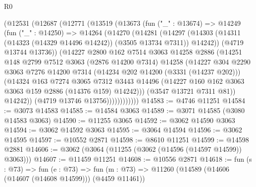 \begin{lexlean}{R0}
\begin{coremodule}
            (@12531
              (@12687
                (@12771
                  (@13519
                    (@13673
                      (fun ("_" : @13674) =>
                      @14249
                        (fun ("_" : @14250) =>
                        @14264
                          (@14270
                            (@14281
                              (@14297
                                (@14303
                                  (@14311 (@14323 (@14329 @14496 @14242)) (@3505 @13734 @7311))
                                  @14242))
                              (@4719 @13744 @13736))
                            (@14227
                              @2800
                              @162
                              @7514
                              @3063
                              @14258
                              @2886
                              (@14251
                                @148
                                @2799
                                @7512
                                @3063
                                (@2876 @14200 @7314)
                                @14258
                                (@14227
                                  @304
                                  @2290
                                  @3063
                                  @7276
                                  @14200
                                  @7314
                                  (@14234 @202 @14200 (@3331 (@14237 @202)))
                                  (@14324
                                    @163
                                    @7274
                                    @3065
                                    @7312
                                    @3443
                                    @14496
                                    (@14227 @160 @162 @3063 @3063 @159 @2886 (@14376 @159) @14242)))
                                (@3547 @13721 @7311 @81))
                              @14242))
                          (@4719 @13746 @13756))))))))))))
@14583 := @4746 @11251
@14584 := @3073 @14583
@14585 := @14584 @3063
@14589 := @3071 @14585 (@3080 @14583 @3063)
@14590 := @11255 @3065
@14592 := @3062 @14590 @3063
@14594 := @3062 @14592 @3063
@14595 := @3064 @14594
@14596 := @3062 @14595
@14597 := @10552 @2871
@14598 := @8610 @11251
@14599 := @14598 @2881
@14606 := @3062 (@3064 (@11255 (@3062 (@14596 (@14597 @14599)) @3063)))
@14607 := @11459 @11251
@14608 := @10556 @2871
@14618 := fun (s : @73) =>
  fun (e : @73) => fun (m : @73) => @11260 (@14589 (@14606 (@14607 (@14608 @14599))) (@4459 @11461))

\end{coremodule}
\end{lexlean}
